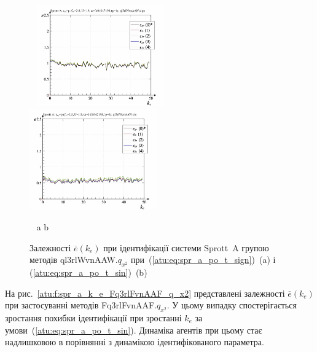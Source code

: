 \begin{figure}[htb!]
\begin{center}
  ~ \hfill
    \includegraphics[width=0.49\textwidth]{p/cha/spr_a/ql3rlWvnAAW_x2/sprott_a_id-p_k_e_sign.png}
    \hfill
    \includegraphics[width=0.49\textwidth]{p/cha/spr_a/ql3rlWvnAAW_x2/sprott_a_id-p_k_e_sin.png}
  \hfill ~
\end{center}
  \vspace{-1.0ex}
  \begin{center}
    ~ \hfill a \hfill\hfill b \hfill ~
  \end{center}
  \caption{Залежності $\overline{e} (k_e)$ при ідентифікації системи Sprott~A групою методів ql3rlWvnAAW.$q_{x^2}$ при~(\ref{atu:eq:spr_a_po_t_sign})~(a) і (\ref{atu:eq:spr_a_po_t_sin})~(b)}
  \label{atu:f:spr_a_k_e_ql3rlWvnAAW_q_x2}
\end{figure}

На рис.~\ref{atu:f:spr_a_k_e_Fq3rlFvnAAF_q_x2} представлені залежності
$\overline{e} (k_e)$ при застосуванні методів
Fq3rlFvnAAF.$q_{x^2}$.
У цьому випадку спостерігається зростання похибки
ідентифікації при зростанні
$k_e$ за умови~(\ref{atu:eq:spr_a_po_t_sin}). Динаміка агентів при цьому
стає надлишковою в порівнянні з динамікою ідентифікованого
параметра.

